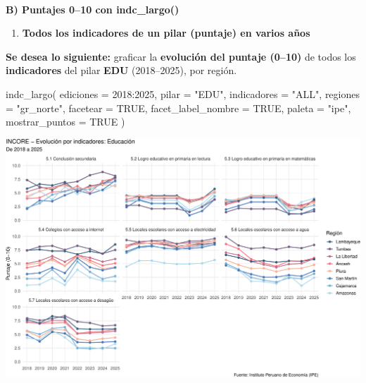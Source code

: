 \documentclass[
  11pt,
  letterpaper,
  DIV=11,
  numbers=noendperiod]{scrartcl}
\makeatletter
\let\oldparagraph\paragraph
\renewcommand{\paragraph}{
    \@ifstar
      \xxxParagraphStar
      \xxxParagraphNoStar
  }
\newcommand{\xxxParagraphStar}[1]{\oldparagraph*{#1}\mbox{}}
\newcommand{\xxxParagraphNoStar}[1]{\oldparagraph{#1}\mbox{}}
\newenvironment{Shaded}{\begin{snugshade}}{\end{snugshade}}
\newcommand{\AttributeTok}[1]{\textcolor[rgb]{0.40,0.45,0.13}{#1}}
\newcommand{\ConstantTok}[1]{\textcolor[rgb]{0.56,0.35,0.01}{#1}}
\newcommand{\DecValTok}[1]{\textcolor[rgb]{0.68,0.00,0.00}{#1}}
\newcommand{\FunctionTok}[1]{\textcolor[rgb]{0.28,0.35,0.67}{#1}}
\newcommand{\NormalTok}[1]{\textcolor[rgb]{0.00,0.23,0.31}{#1}}
\newcommand{\SpecialCharTok}[1]{\textcolor[rgb]{0.37,0.37,0.37}{#1}}
\newcommand{\StringTok}[1]{\textcolor[rgb]{0.13,0.47,0.30}{#1}}
\providecommand{\tightlist}{%
  \setlength{\itemsep}{0pt}\setlength{\parskip}{0pt}}\usepackage{longtable,booktabs,array}
\makeatother
\begin{document}
\paragraph{\texorpdfstring{\textbf{B) Puntajes 0--10 con
indc\_largo()}}{B) Puntajes 0--10 con indc\_largo()}}\label{b-puntajes-010-con-indc_largo}

\begin{enumerate}
\def\labelenumi{\arabic{enumi}.}
\tightlist
\item
  \textbf{Todos los indicadores de un pilar (puntaje) en varios años}
\end{enumerate}

\textbf{Se desea lo siguiente:} graficar la \textbf{evolución del
puntaje (0--10)} de todos los \textbf{indicadores} del pilar
\textbf{EDU} (2018--2025), por región.

\begin{Shaded}
\begin{Highlighting}[]
\FunctionTok{indc\_largo}\NormalTok{(}
  \AttributeTok{ediciones          =} \DecValTok{2018}\SpecialCharTok{:}\DecValTok{2025}\NormalTok{,}
  \AttributeTok{pilar              =} \StringTok{"EDU"}\NormalTok{,}
  \AttributeTok{indicadores        =} \StringTok{"ALL"}\NormalTok{,}
  \AttributeTok{regiones           =} \StringTok{"gr\_norte"}\NormalTok{,}
  \AttributeTok{facetear           =} \ConstantTok{TRUE}\NormalTok{,}
  \AttributeTok{facet\_label\_nombre =} \ConstantTok{TRUE}\NormalTok{,}
  \AttributeTok{paleta             =} \StringTok{"ipe"}\NormalTok{,}
  \AttributeTok{mostrar\_puntos     =} \ConstantTok{TRUE}
\NormalTok{)}
\end{Highlighting}
\end{Shaded}

\includegraphics{Manual_files/figure-pdf/unnamed-chunk-81-1.pdf}
\end{document}
